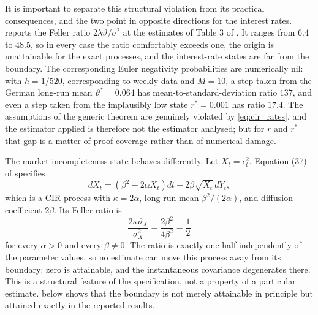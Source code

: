 \documentclass[11pt]{article}
\theoremstyle{definition}
\begin{document}
It is important to separate this structural violation from its practical consequences, and the two point in opposite directions for the interest rates.  reports the Feller ratio $2\lambda\vartheta/\sigma^2$ at the estimates of Table 3 of \citet{BrandtSantaClara2002}. It ranges from $6.4$ to $48.5$, so in every case the ratio comfortably exceeds one, the origin is unattainable for the exact processes, and the interest-rate states are far from the boundary. The corresponding Euler negativity probabilities are numerically nil: with $h=1/520$, corresponding to weekly data and $M=10$, a step taken from the German long-run mean $\vartheta^*=0.064$ has mean-to-standard-deviation ratio $137$, and even a step taken from the implausibly low state $r^*=0.001$ has ratio $17.4$. The assumptions of the generic theorem are genuinely violated by \eqref{eq:cir_rates}, and the estimator applied is therefore not the estimator analysed; but for $r$ and $r^*$ that gap is a matter of proof coverage rather than of numerical damage.

The market-incompleteness state behaves differently. Let $X_t=\epsilon_t^2$. Equation (37) of \citet{BrandtSantaClara2002} specifies
\begin{equation}\label{eq:epsilon_cir}
dX_t=(\beta^2-2\alpha X_t)dt+2\beta\sqrt{X_t}\,dY_t,
\end{equation}
which is a CIR process with $\kappa=2\alpha$, long-run mean $\beta^2/(2\alpha)$, and diffusion coefficient $2\beta$. Its Feller ratio is
\[
\frac{2\kappa\vartheta_X}{\sigma_X^2}
=\frac{2\beta^2}{4\beta^2}
=\frac12
\]
for every $\alpha>0$ and every $\beta\ne0$. The ratio is exactly one half independently of the parameter values, so no estimate can move this process away from its boundary: zero is attainable, and the instantaneous covariance degenerates there. This is a structural feature of the specification, not a property of a particular estimate.  below shows that the boundary is not merely attainable in principle but attained exactly in the reported results.
\end{document}
